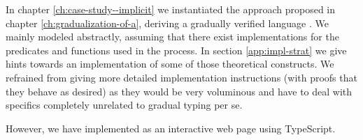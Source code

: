 In chapter \ref{ch:case-study--implicit} we instantiated the approach proposed in chapter \ref{ch:gradualization-of-a}, deriving a gradually verified language \gvlidf.
We mainly modeled \gvlidf abstractly, assuming that there exist implementations for the predicates and functions used in the process.
In section \ref{app:impl-strat} we give hints towards an implementation of some of those theoretical constructs.
We refrained from giving more detailed implementation instructions (with proofs that they behave as desired) as they would be very voluminous and have to deal with specifics completely unrelated to gradual typing per se.

However, we have implemented \gvlidf as an interactive web page using TypeScript.\\
